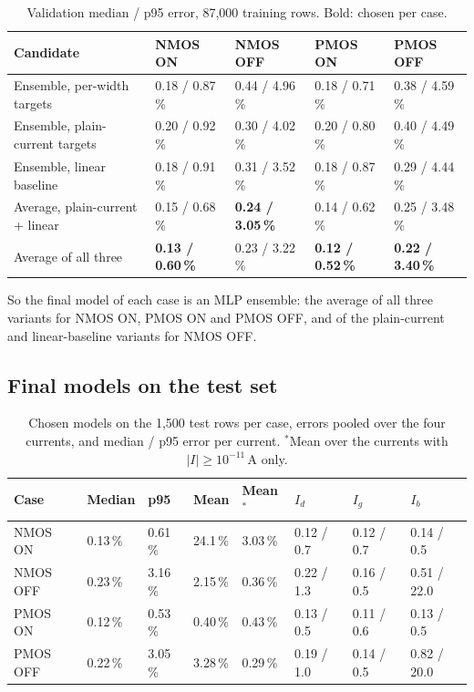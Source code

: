 \documentclass[11pt,a4paper]{article}
\newcommand{\pct}{\,\%}
\begin{document}
\begin{table}[H]
\centering
\caption{Validation median / p95 error, 87,000 training rows. Bold: chosen per case.}
\label{tab:ens}
\small\setlength{\tabcolsep}{4pt}
\begin{tabular}{lllll}
\toprule
Candidate & NMOS ON & NMOS OFF & PMOS ON & PMOS OFF \\
\midrule
Ensemble, per-width targets & 0.18 / 0.87\pct & 0.44 / 4.96\pct & 0.18 / 0.71\pct & 0.38 / 4.59\pct \\
Ensemble, plain-current targets & 0.20 / 0.92\pct & 0.30 / 4.02\pct & 0.20 / 0.80\pct & 0.40 / 4.49\pct \\
Ensemble, linear baseline & 0.18 / 0.91\pct & 0.31 / 3.52\pct & 0.18 / 0.87\pct & 0.29 / 4.44\pct \\
Average, plain-current + linear & 0.15 / 0.68\pct & \textbf{0.24 / 3.05\pct} & 0.14 / 0.62\pct & 0.25 / 3.48\pct \\
Average of all three & \textbf{0.13 / 0.60\pct} & 0.23 / 3.22\pct & \textbf{0.12 / 0.52\pct} & \textbf{0.22 / 3.40\pct} \\
\bottomrule
\end{tabular}
\end{table}

So the final model of each case is an MLP ensemble: the average of all three variants for NMOS ON,
PMOS ON and PMOS OFF, and of the plain-current and linear-baseline variants for NMOS OFF.

\subsection{Final models on the test set}

\begin{table}[H]
\centering
\caption{Chosen models on the 1,500 test rows per case, errors pooled over the four currents, and
median / p95 error per current. $^{*}$Mean over the currents with $|I| \geq 10^{-11}$\,A only.}
\label{tab:test}
\small\setlength{\tabcolsep}{4pt}
\begin{tabular}{llllllll}
\toprule
Case & Median & p95 & Mean & Mean$^{*}$ & $I_d$ & $I_g$ & $I_b$ \\
\midrule
NMOS ON  & 0.13\pct & 0.61\pct & 24.1\pct & 3.03\pct & 0.12 / 0.7 & 0.12 / 0.7 & 0.14 / 0.5 \\
NMOS OFF & 0.23\pct & 3.16\pct & 2.15\pct & 0.36\pct & 0.22 / 1.3 & 0.16 / 0.5 & 0.51 / 22.0 \\
PMOS ON  & 0.12\pct & 0.53\pct & 0.40\pct & 0.43\pct & 0.13 / 0.5 & 0.11 / 0.6 & 0.13 / 0.5 \\
PMOS OFF & 0.22\pct & 3.05\pct & 3.28\pct & 0.29\pct & 0.19 / 1.0 & 0.14 / 0.5 & 0.82 / 20.0 \\
\bottomrule
\end{tabular}
\end{table}
\end{document}
